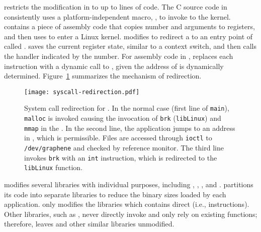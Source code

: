 \graphene{} restricts the modification in \glibc{}
to up to \gipclines{} lines of code.
The C source code in \glibc{} consistently uses a platform-independent macro,
,
to invoke \linuxapis{} to the kernel.
 contains a piece of assembly code
that copies \linuxapi{} number and arguments to registers,
and then uses  to enter a Linux kernel.
\graphene{} modifies 
to redirect a \linuxapi{} to
an entry point of \thelibos{} called .
 saves the current register state, similar to a context switch,
and then
calls the \linuxapi{} handler
indicated by the \linuxapi{} number.
For assembly code in \glibc{},
\graphene{} replaces each  instruction with
a dynamic call to
, given the address of  is dynamically determined.
Figure~\ref{fig:libos:syscall-redirection} summarizes the mechanism of \linuxapi{} redirection.


\begin{figure}[t!]
\centering
\texttt{[image: syscall-redirection.pdf]}
\footnotesize
\caption{System call redirection for \thelibos{}.
In the normal case (first line of {\tt main}), {\tt malloc} is invoked causing the invocation of {\tt brk} ({\tt libLinux}) and {\tt mmap} in the \pal{}. In the second line, the application jumps to an address in \pal{}, which is permissible.
Files are accessed through {\tt ioctl} to {\tt /dev/graphene} and checked by reference monitor.
The third line invokes {\tt brk} with an {\tt int} instruction, which is redirected to the {\tt libLinux} function.}
\label{fig:libos:syscall-redirection}
\end{figure}


\graphene{} modifies several \glibc{} libraries with individual purposes,
including , , \libpthread{}, and \libdl{}.
\Glibc{} partitions its code into separate libraries to reduce the binary sizes
loaded by each application.
\graphene{} only modifies the libraries which contains direct \linuxapis{} (i.e.,  instructions).
Other \libc{} libraries, such as ,
never directly invoke \linuxapis{} and only rely on 
existing \libc{} functions;
therefore, \graphene{} leaves  and other similar \libc{} libraries unmodified.



